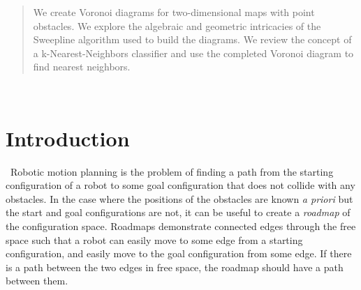 \documentclass[conference]{IEEEtran}
\begin{document}
\maketitle

\begin{abstract}
    We create Voronoi diagrams for two-dimensional maps with point obstacles.
    We explore the algebraic and geometric intricacies of the Sweepline algorithm used
    to build the diagrams. We review the concept of a k-Nearest-Neighbors classifier
    and use the completed Voronoi diagram to find nearest neighbors.
\end{abstract}





%
\IEEEpeerreviewmaketitle\



\section{Introduction}
\noindent\ Robotic motion planning is the problem of finding a path from the starting
configuration of a robot to some goal configuration that does not collide
with any obstacles. In the case where the positions of the obstacles are
known \emph{a priori} but the start and goal configurations are not, it
can be useful to create a \emph{roadmap} of the configuration space.
Roadmaps demonstrate connected edges through the free space such that a
robot can easily move to some edge from a starting configuration, and
easily move to the goal configuration from some edge. If there is a path
between the two edges in free space, the roadmap should have a path between
them.
\end{document}
